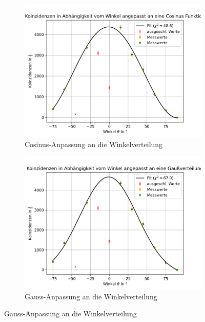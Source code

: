 \documentclass{article}
\begin{document}
\begin{figure}[H]
    \centering
    \begin{subfigure}[b]{0.48\textwidth}
        \includegraphics[width=1\textwidth]{figures/cosAnpassung.png}
        \caption{Cosinus-Anpassung an die Winkelverteilung}
        \label{fig:WinkelverteilungCosinus}
    \end{subfigure}
    \hfill
    \begin{subfigure}[b]{0.48\textwidth}
        \includegraphics[width=1\textwidth]{figures/gaussAnpassung.png}
        \caption{Gauss-Anpassung an die Winkelverteilung}
        \label{fig:WinkelverteilungGauss}
    \end{subfigure}
    \label{fig:WinkelverteilungKomplett}
\end{figure}
\end{document}
